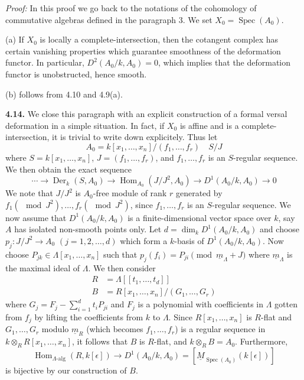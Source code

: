 \documentclass[11pt]{article}
\theoremstyle{plain}
\theoremstyle{definition}
\theoremstyle{remark}
\DeclareMathOperator{\Spec}{Spec}
\DeclareMathOperator{\Hom}{Hom}
\DeclareMathOperator{\Der}{Der}
\begin{document}
\medskip
\noindent\textit{Proof:} In this proof we go back to the notations of the cohomology of commutative algebras defined in the paragraph 3. We set $X_0 = \Spec(A_0)$.

(a) If $X_0$ is locally a complete-intersection, then the cotangent complex has certain vanishing properties which guarantee smoothness of the deformation functor. In particular, $D^2(A_0/k, A_0) = 0$, which implies that the deformation functor is unobstructed, hence smooth.

(b) follows from 4.10 and 4.9(a).

\medskip
\noindent\textbf{4.14.} We close this paragraph with an explicit construction of a formal versal deformation in a simple situation. In fact, if $X_0$ is affine and is a complete-intersection, it is trivial to write down explicitely. Thus let
\[A_0 = k[x_1, \ldots, x_n]/(f_1, \ldots, f_r) \quad S/J\]
where $S = k[x_1, \ldots, x_n]$, $J = (f_1, \ldots, f_r)$, and $f_1, \ldots, f_r$ is an $S$-regular sequence. We then obtain the exact sequence
\[\cdots \to \Der_k(S, A_0) \to \Hom_{A_0}(J/J^2, A_0) \to D^1(A_0/k, A_0) \to 0\]
We note that $J/J^2$ is $A_0$-free module of rank $r$ generated by $f_1 (\mod J^2), \ldots, f_r (\mod J^2)$, since $f_1, \ldots, f_r$ is an $S$-regular sequence. We now assume that $D^1(A_0/k, A_0)$ is a finite-dimensional vector space over $k$, say $A$ has isolated non-smooth points only. Let $d = \dim_k D^1(A_0/k, A_0)$ and choose $p_j : J/J^2 \to A_0$ $(j = 1, 2, \ldots, d)$ which form a $k$-basis of $D^1(A_0/k, A_0)$. Now choose $P_{jk} \in \Lambda[x_1, \ldots, x_n]$ such that $p_j(f_i) = P_{ji} \pmod{\underline{m}_\Lambda + J}$ where $\underline{m}_\Lambda$ is the maximal ideal of $\Lambda$. We then consider
\begin{align*}
R &= \Lambda[[t_1, \ldots, t_d]] \\
B &= R[x_1, \ldots, x_n]/(G_1, \ldots, G_r)
\end{align*}
where $G_j = F_j - \sum\limits_{i=1}^d t_i P_{ji}$ and $F_j$ is a polynomial with coefficients in $\Lambda$ gotten from $f_j$ by lifting the coefficients from $k$ to $\Lambda$. Since $R[x_1, \ldots, x_n]$ is $R$-flat and $G_1, \ldots, G_r$ modulo $\underline{m}_R$ (which becomes $f_1, \ldots, f_r$) is a regular sequence in $k \otimes_R R[x_1, \ldots, x_n]$, it follows that $B$ is $R$-flat, and $k \otimes_R B = A_0$. Furthermore,
\[\Hom_{\Lambda\text{-alg}}(R, k[\epsilon]) \to D^1(A_0/k, A_0) = [\underline{M}_{\Spec(A_0)}(k[\epsilon])]\]
is bijective by our construction of $B$.
\end{document}
